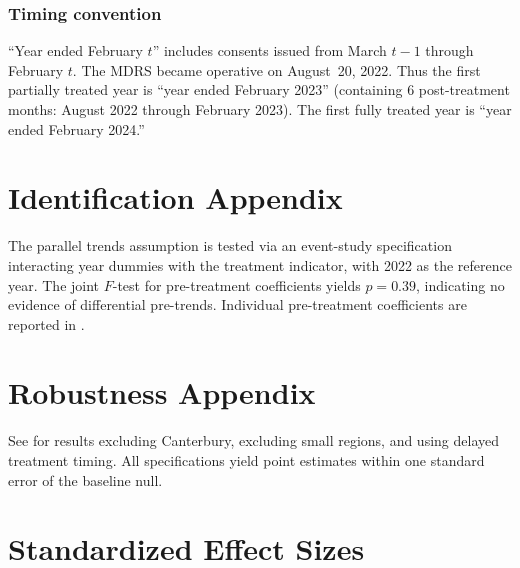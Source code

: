\documentclass[12pt]{article}
\begin{document}
\subsubsection*{Timing convention} ``Year ended February $t$'' includes consents issued from March $t-1$ through February $t$. The MDRS became operative on August~20, 2022. Thus the first partially treated year is ``year ended February 2023'' (containing 6 post-treatment months: August 2022 through February 2023). The first fully treated year is ``year ended February 2024.''


\section{Identification Appendix}

The parallel trends assumption is tested via an event-study specification interacting year dummies with the treatment indicator, with 2022 as the reference year. The joint $F$-test for pre-treatment coefficients yields $p = 0.39$, indicating no evidence of differential pre-trends. Individual pre-treatment coefficients are reported in .


\section{Robustness Appendix}

See  for results excluding Canterbury, excluding small regions, and using delayed treatment timing. All specifications yield point estimates within one standard error of the baseline null.


\section{Standardized Effect Sizes}
\label{sec:sde}


\end{document}
